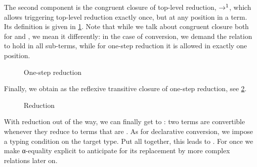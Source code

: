 The second component is the congruent closure of top-level reduction,
 $\rightarrow^1$, which allows triggering top-level reduction exactly once,
but at any position in a term. Its definition is given in \cref{fig:ccw-ored}.
Note that while we talk about congruent closure both for
 and , we mean it differently: in the
case of conversion, we demand the relation to hold in all sub-terms,
while for one-step reduction it is allowed in exactly one position.

\begin{figure}[ht]
  \ContinuedFloat
  \caption{One-step reduction}
  \label{fig:ccw-ored}
\end{figure}

Finally, we obtain  as the reflexive
transitive closure of one-step reduction, see \cref{fig:red}.

\begin{figure}[h]
  \ContinuedFloat
  \caption{Reduction}
  \label{fig:red}
\end{figure}

With reduction out of the way, we can finally get to : two terms
are convertible whenever they reduce to terms that are .
As for declarative conversion,
we impose a typing condition on the target type. Put all together, this leads to
. For once we make α-equality explicit to anticipate for
its replacement by more complex relations later on.

